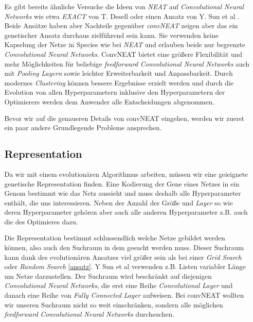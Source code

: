 \documentclass[]{scrartcl}
\begin{document}
		Es gibt bereits ähnliche Versuche die Ideen von \textit{NEAT} auf \textit{Convolutional Neural Networks} wie etwa
		\textit{EXACT} von T. Desell \cite{exact} oder einen Ansatz von Y. Sun et al \cite{convoneat}.
		Beide Ansätze haben aber Nachteile gegenüber \textit{convNEAT} zeigen aber das ein genetischer Ansatz durchaus zielführend sein kann.
		Sie verwenden keine Kapselung der Netze in Species wie bei \textit{NEAT} und erlauben beide nur begrenzte \textit{Convolutional Neural Networks}.
		ConvNEAT bietet eine größere Flexibilität und mehr Möglichkeiten für beliebige \textit{feedforward Convolutional Neural Networks}
		auch mit \textit{Pooling Layern} sowie leichter Erweiterbarkeit und Anpassbarkeit. Durch modernes \textit{Clustering} können
		bessere Ergebnisse erzielt werden und durch die Evolution von allen Hyperparametern inklusive den Hyperparametern der Optimierers
		werden dem Anwender alle Entscheidungen abgenommen.
		
		Bevor wir auf die genaueren Details von convNEAT eingehen, werden wir zuerst ein paar andere Grundlegende Probleme ansprechen.

		\subsection{Representation}

			Da wir mit einem evolutionären Algorithmus arbeiten, müssen wir eine geieignete genetische Representation finden.
			Eine Kodierung der Gene eines Netzes in ein Genom bestimmt wie das Netz aussieht und muss deshalb alle Hyperparameter enthält, die uns interessieren.
			Neben der Anzahl der Größe und \textit{Layer} so wie deren Hyperparameter gehören aber auch alle anderen Hyperparameter z.B. auch
			die des Optimieres dazu.

			Die Representation bestimmt schlussendlich welche Netze gebildet werden können, also auch den Suchraum in dem gesucht werden muss.
			Dieser Suchraum kann dank des evolutionären Ansatzes viel größer sein als bei einer \textit{Grid Search} oder \textit{Random Search} \ref{ansatz}.
			Y Sun et al \cite{convoneat} verwenden z.B. Listen variabler Länge um Netze darzustellen.
			Der Suchraum wird beschränkt auf diejenigen \textit{Convolutional Neural Networks}, die erst eine Reihe \textit{Convolutional Layer}
			und danach eine Reihe von \textit{Fully Connected Layer} aufweisen.
			Bei convNEAT wollten wir unseren Suchraum nicht so weit einschränken, sondern alle möglichen \textit{feedforward Convolutional Neural Networks} durchsuchen.
\end{document}
